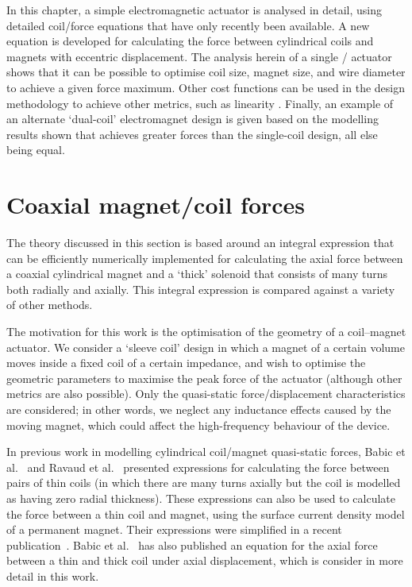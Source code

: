 \documentclass[11pt,a4paper]{memoir}
\begin{document}
In this chapter, a simple electromagnetic actuator is analysed in detail, using detailed coil/force equations that have only recently been available.
A new equation is developed for calculating the force between cylindrical coils and magnets with eccentric displacement.
The analysis herein of a single \dof/ actuator shows that it can be possible to optimise coil size, magnet size, and wire diameter to achieve a given force maximum.
Other cost functions can be used in the design methodology to achieve other metrics, such as linearity \cite{merit2009}.
Finally, an example of an alternate `dual-coil' electromagnet design is given based on the modelling results shown that achieves greater forces than the single-coil design, all else being equal.


\section{Coaxial magnet/coil forces}

The theory discussed in this section is based around an integral expression that can be efficiently numerically implemented for calculating the axial force between a coaxial cylindrical magnet and a `thick' solenoid that consists of many turns both radially and axially.
This integral expression is compared against a variety of other methods.

The motivation for this work is the optimisation of the geometry of a coil--magnet actuator.
We consider a `sleeve coil' design in which a magnet of a certain volume moves inside a fixed coil of a certain impedance, and wish to optimise the geometric parameters to maximise the peak force of the actuator (although other metrics are also possible).
Only the quasi-static force/displacement characteristics are considered; in other words, we neglect any inductance effects caused by the moving magnet, which could affect the high-frequency behaviour of the device.

In previous work in modelling cylindrical coil/magnet quasi-static forces, Babic et al.~\cite{babic2008-ietm} and Ravaud et al.~\cite{ravaud2010-pier} presented expressions for calculating the force between pairs of thin coils (in which there are many turns axially but the coil is modelled as having zero radial thickness). These expressions can also be used to calculate the force between a thin coil and magnet, using the surface current density model of a permanent magnet.
Their expressions were simplified in a recent publication~\cite{robertson2011-ietm}.
Babic et al.~\cite{babic2011-ietm} has also published an equation for the axial force between a thin and thick coil under axial displacement, which is consider in more detail in this work.
\end{document}
